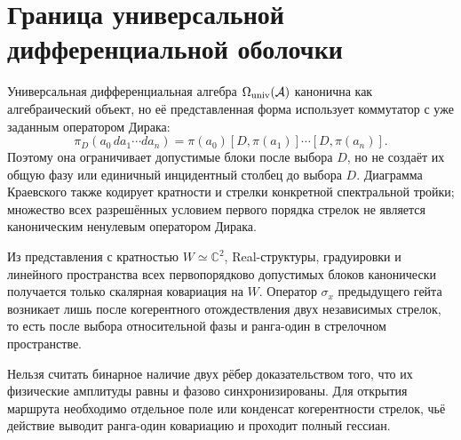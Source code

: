 \section{Граница универсальной дифференциальной оболочки}

Универсальная дифференциальная алгебра $\Omega_{\rm univ}(\mathcal A)$
канонична как алгебраический объект, но её представленная форма использует
коммутатор с уже заданным оператором Дирака:
\begin{equation}
 \pi_D(a_0\,da_1\cdots da_n)
 =\pi(a_0)[D,\pi(a_1)]\cdots[D,\pi(a_n)].
 \label{eq:v7-incidence-represented-universal-form}
\end{equation}
Поэтому она ограничивает допустимые блоки после выбора $D$, но не создаёт
их общую фазу или единичный инцидентный столбец до выбора $D$. Диаграмма
Краевского также кодирует кратности и стрелки конкретной спектральной тройки;
множество всех разрешённых условием первого порядка стрелок не является
каноническим ненулевым оператором Дирака.

\begin{theorem}
Из представления с кратностью $W\simeq\mathbb C^2$, Real-структуры,
градуировки и линейного пространства всех первопорядково допустимых блоков
канонически получается только скалярная ковариация на $W$. Оператор
$\sigma_x$ предыдущего гейта возникает лишь после когерентного отождествления
двух независимых стрелок, то есть после выбора относительной фазы и
ранга-один в стрелочном пространстве.
\end{theorem}

\begin{nogocriterion}
Нельзя считать бинарное наличие двух рёбер доказательством того, что их
физические амплитуды равны и фазово синхронизированы. Для открытия маршрута
необходимо отдельное поле или конденсат когерентности стрелок, чьё действие
выводит ранга-один ковариацию и проходит полный гессиан.
\end{nogocriterion}

